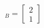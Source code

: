 \documentclass[preview]{standalone}
\begin{document}
\begin{align*}
[\vec x]_{B}=\begin{bmatrix}2\\1\end{bmatrix}
\end{align*}
\end{document}
